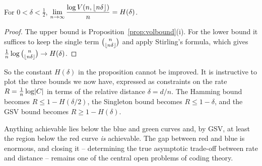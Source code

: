 \documentclass[a4paper]{scrartcl}
\DeclarePairedDelimiter{\floor}{\lfloor}{\rfloor}
\begin{document}
\begin{lemma}
	For $0 < \delta < \tfrac12$, $\displaystyle \lim_{n \to \infty}\frac{\log V(n,\floor{n\delta})}{n} = H(\delta)$.
\end{lemma}

\begin{proof}
	The upper bound is Proposition~\ref{prop:volbound}(i). For the lower bound it suffices to keep the single term $\binom{n}{\floor{n\delta}}$ and apply Stirling's formula, which gives $\frac1n\log\binom{n}{\floor{n\delta}} \to H(\delta)$.
\end{proof}

So the constant $H(\delta)$ in the proposition cannot be improved. It is instructive to plot the three bounds we now have, expressed as constraints on the rate $R = \frac1n \log \lvert C\rvert$ in terms of the relative distance $\delta = d/n$. The Hamming bound becomes $R \le 1 - H(\delta/2)$, the Singleton bound becomes $R \le 1 - \delta$, and the GSV bound becomes $R \ge 1 - H(\delta)$.

\begin{center}
\end{center}

Anything achievable lies below the blue and green curves and, by GSV, at least the region below the red curve \emph{is} achievable. The gap between red and blue is enormous, and closing it -- determining the true asymptotic trade-off between rate and distance -- remains one of the central open problems of coding theory.
\end{document}
